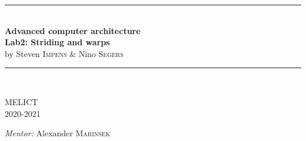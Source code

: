 \begin{titlepage}
\begin{center}

\rule{\linewidth}{1.5pt}\\[0.4cm]
{ \LARGE \bfseries Advanced computer architecture}\\[0.4cm]
{ \LARGE \bfseries Lab2: Striding and warps}\\[0.4cm]
{by Steven \textsc{Impens} \& Nino \textsc{Segers}}\\[0.2cm]
\rule{\linewidth}{1.5pt}\\[1.5cm]

\vfill

\begin{minipage}{0.49\textwidth}
\begin{flushleft} \large
MELICT\\
2020-2021\\
\end{flushleft}
\end{minipage}
\begin{minipage}{0.49\textwidth}
\begin{flushright} \large
\emph{Mentor:}
Alexander \textsc{Marinsek}\\
\end{flushright}
\end{minipage}

\end{center}
\end{titlepage}
